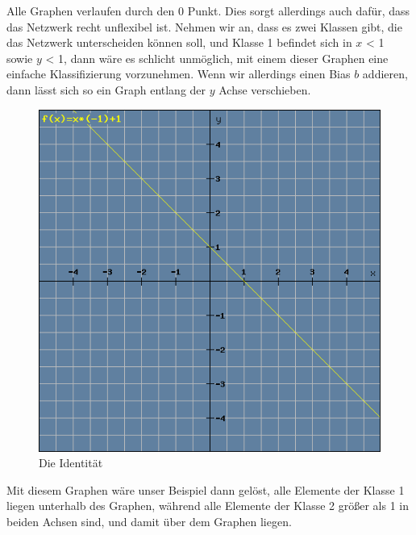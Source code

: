 \documentclass[12pt]{article}
\begin{document}
Alle Graphen verlaufen durch den 0 Punkt. Dies sorgt allerdings auch dafür, dass das Netzwerk recht unflexibel ist. Nehmen wir an, dass es zwei Klassen gibt, die das Netzwerk unterscheiden können soll, und Klasse 1 befindet sich in $x$ < 1 sowie $y$ < 1, dann wäre es schlicht unmöglich, mit einem dieser Graphen eine einfache Klassifizierung vorzunehmen. Wenn wir allerdings einen Bias $b$ addieren, dann lässt sich so ein Graph entlang der $y$ Achse verschieben.\begin{figure}[H]
\centering
\includegraphics[scale=0.60]{./Images/Pasted image 20231005144628.png}
\caption{Die Identität}
\label{Was kommt hier rein?}\end{figure}Mit diesem Graphen wäre unser Beispiel dann gelöst, alle Elemente der Klasse 1 liegen unterhalb des Graphen, während alle Elemente der Klasse 2 größer als 1 in beiden Achsen sind, und damit über dem Graphen liegen.
\end{document}
